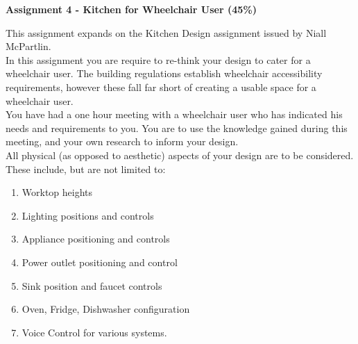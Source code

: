 

\begin{flushleft}
\Large\textbf{Assignment 4 - Kitchen for Wheelchair User (45\%)}\\
\end{flushleft}

This assignment expands on the Kitchen Design assignment issued by Niall McPartlin.\\

In this assignment you are require to re-think your design to cater for a wheelchair user.  The building regulations establish wheelchair accessibility requirements, however these fall far short of creating a usable space for a wheelchair user. \\

You have had a one hour meeting with a wheelchair user who has indicated his needs and requirements to you.  You are to use the knowledge gained during this meeting, and your own research to inform your design.\\

All physical (as opposed to aesthetic) aspects of your design are to be considered.  These include, but are not limited to:

\begin{enumerate}
	\item Worktop heights
	\item Lighting positions and controls
	\item Appliance positioning and controls
	\item Power outlet positioning and control
	\item Sink position and faucet controls
	\item Oven, Fridge, Dishwasher configuration
	\item Voice Control for various systems.
\end{enumerate}

\vspace{0.5cm}




